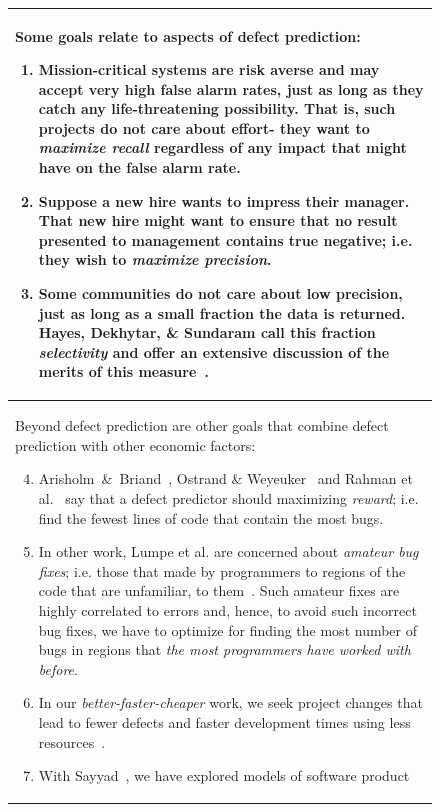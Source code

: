 \documentclass[sigconf,anonymous,review]{acmart}
\begin{document}
\begin{figure}[!t]
\small

\begin{tabular}{p{.95\linewidth}}\hline 
\rowcolor{gray!10}
Some goals relate to aspects of defect prediction:
\begin{enumerate}[leftmargin=0.4cm]
 
\item
Mission-critical systems are risk averse and may accept very high false alarm rates,
just as long as they catch any life-threatening possibility. That is, such projects
do not care about effort- they want to {\em maximize recall} regardless of any impact
that might have on the false alarm rate.
\item  Suppose a new hire wants
 to impress their manager. That
 new hire might want to ensure that no result presented to  management contains  true negative;
i.e. they wish to {\em maximize precision}.
\item
Some communities do not care about   low precision,
just as long as a small fraction the data is returned. Hayes, Dekhytar, \& Sundaram call this fraction
{\em selectivity} and offer an
extensive discussion of the merits of this measure~\cite{hayes06}.
\end{enumerate}
 \\ \hline
\rowcolor{gray!10}
Beyond defect prediction are other goals that combine defect prediction with other economic
factors:
\begin{enumerate}[leftmargin=0.4cm]
\setcounter{enumi}{3}
\item
Arisholm~\&~Briand~\cite{arisholm06},  Ostrand \& Weyeuker~\cite{ostrand04} and Rahman et al.~\cite{rahman12}
say that a defect predictor should maximizing {\em reward}; i.e. find the fewest lines of code
that contain the most bugs.
\item In other work, Lumpe et al. are concerned about
 {\em amateur  bug fixes}; i.e. those that made by programmers to
regions of the code that are unfamiliar, to them~\cite{me11f}.
Such amateur fixes are highly correlated to errors and, hence, to
avoid such incorrect bug fixes, we have to optimize
for finding the most number of bugs in regions that {\em the most programmers have worked with before}.
\item In our  {\em better-faster-cheaper} work, we seek  project changes that lead
to fewer defects and faster development times using less resources~\cite{elrawas10,me07f,me09a,me09f}.
\item
With Sayyad~\cite{sayyad13a,sayyad13b}, we have explored models of software product

\end{enumerate}
\end{tabular}
\end{figure}
\end{document}
